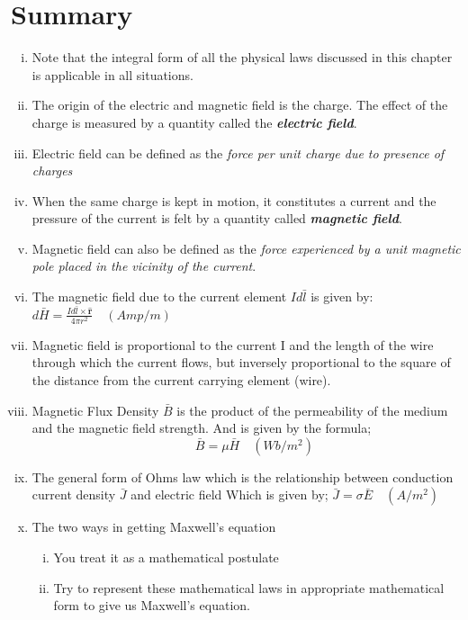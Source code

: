 \section{Summary}
\begin{enumerate}[(i)]
\item Note that the integral form of all the physical laws discussed in this chapter is applicable in all situations.

\item The origin of the electric and magnetic field is the charge. The effect of the charge is measured by a quantity called the \textbf{\emph{electric field}}.

\item Electric field can be defined as the \emph{force per unit charge due to presence of charges} 

\item When the same charge is kept in motion, it constitutes a current and the pressure of the current is felt by a quantity called \textbf{\emph{magnetic field}}.

\item Magnetic field can also be defined as the \emph{force experienced by a unit magnetic pole placed in the vicinity of the current}.

\item The magnetic field due to the current element $Id\bar{l}$ is given by:
$\boxed{d\bar{H}= \frac{Id\bar{l} \times \hat{\textbf{r}}}{4\pi r^{2}}}\quad (Amp/m)$ 

\item Magnetic field is proportional to the current I and the length of the wire through which the current flows, but inversely proportional to the square of the distance from the current carrying element (wire).

\item Magnetic Flux Density $\bar{B}$ is the product of the permeability of the medium and the magnetic field strength. And is given by the formula;
$$\quad\boxed{\bar{B} = \mu\bar{H}}\quad (Wb/m^{2})$$

\item The general form of Ohms law which is the relationship between conduction current density $\bar{J}$ and electric field Which is given by; $\boxed{\bar{J} = \sigma\bar{E}}\quad (A/m^{2})$

\item The two ways in getting Maxwell's equation 
\begin{enumerate}[(i)]
\item	You treat it as a mathematical postulate
\item	Try to represent these mathematical laws in appropriate mathematical form to give us Maxwell's equation.
\end{enumerate}


\end{enumerate}
